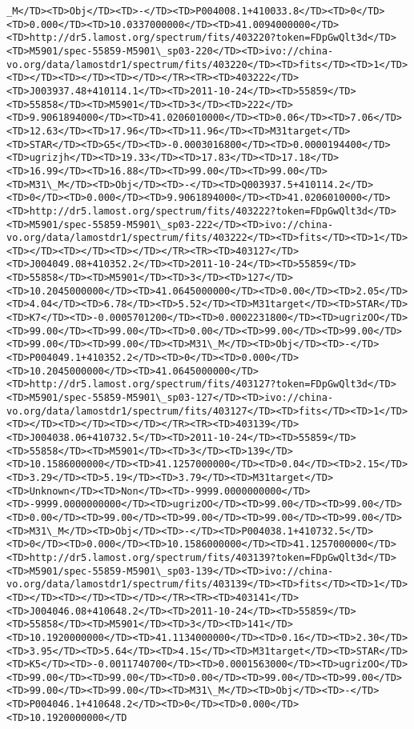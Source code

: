 \documentclass[11pt]{article}
\begin{document}
\begin{Verbatim}[commandchars=\\\{\}]
_M</TD><TD>Obj</TD><TD>-</TD><TD>P004008.1+410033.8</TD><TD>0</TD><TD>0.000</TD><TD>10.0337000000</TD><TD>41.0094000000</TD><TD>http://dr5.lamost.org/spectrum/fits/403220?token=FDpGwQlt3d</TD><TD>M5901/spec-55859-M5901\_sp03-220</TD><TD>ivo://china-vo.org/data/lamostdr1/spectrum/fits/403220</TD><TD>fits</TD><TD>1</TD><TD></TD><TD></TD><TD></TD></TR><TR><TD>403222</TD><TD>J003937.48+410114.1</TD><TD>2011-10-24</TD><TD>55859</TD><TD>55858</TD><TD>M5901</TD><TD>3</TD><TD>222</TD><TD>9.9061894000</TD><TD>41.0206010000</TD><TD>0.06</TD><TD>7.06</TD><TD>12.63</TD><TD>17.96</TD><TD>11.96</TD><TD>M31target</TD><TD>STAR</TD><TD>G5</TD><TD>-0.0003016800</TD><TD>0.0000194400</TD><TD>ugrizjh</TD><TD>19.33</TD><TD>17.83</TD><TD>17.18</TD><TD>16.99</TD><TD>16.88</TD><TD>99.00</TD><TD>99.00</TD><TD>M31\_M</TD><TD>Obj</TD><TD>-</TD><TD>Q003937.5+410114.2</TD><TD>0</TD><TD>0.000</TD><TD>9.9061894000</TD><TD>41.0206010000</TD><TD>http://dr5.lamost.org/spectrum/fits/403222?token=FDpGwQlt3d</TD><TD>M5901/spec-55859-M5901\_sp03-222</TD><TD>ivo://china-vo.org/data/lamostdr1/spectrum/fits/403222</TD><TD>fits</TD><TD>1</TD><TD></TD><TD></TD><TD></TD></TR><TR><TD>403127</TD><TD>J004049.08+410352.2</TD><TD>2011-10-24</TD><TD>55859</TD><TD>55858</TD><TD>M5901</TD><TD>3</TD><TD>127</TD><TD>10.2045000000</TD><TD>41.0645000000</TD><TD>0.00</TD><TD>2.05</TD><TD>4.04</TD><TD>6.78</TD><TD>5.52</TD><TD>M31target</TD><TD>STAR</TD><TD>K7</TD><TD>-0.0005701200</TD><TD>0.0002231800</TD><TD>ugrizOO</TD><TD>99.00</TD><TD>99.00</TD><TD>0.00</TD><TD>99.00</TD><TD>99.00</TD><TD>99.00</TD><TD>99.00</TD><TD>M31\_M</TD><TD>Obj</TD><TD>-</TD><TD>P004049.1+410352.2</TD><TD>0</TD><TD>0.000</TD><TD>10.2045000000</TD><TD>41.0645000000</TD><TD>http://dr5.lamost.org/spectrum/fits/403127?token=FDpGwQlt3d</TD><TD>M5901/spec-55859-M5901\_sp03-127</TD><TD>ivo://china-vo.org/data/lamostdr1/spectrum/fits/403127</TD><TD>fits</TD><TD>1</TD><TD></TD><TD></TD><TD></TD></TR><TR><TD>403139</TD><TD>J004038.06+410732.5</TD><TD>2011-10-24</TD><TD>55859</TD><TD>55858</TD><TD>M5901</TD><TD>3</TD><TD>139</TD><TD>10.1586000000</TD><TD>41.1257000000</TD><TD>0.04</TD><TD>2.15</TD><TD>3.29</TD><TD>5.19</TD><TD>3.79</TD><TD>M31target</TD><TD>Unknown</TD><TD>Non</TD><TD>-9999.0000000000</TD><TD>-9999.0000000000</TD><TD>ugrizOO</TD><TD>99.00</TD><TD>99.00</TD><TD>0.00</TD><TD>99.00</TD><TD>99.00</TD><TD>99.00</TD><TD>99.00</TD><TD>M31\_M</TD><TD>Obj</TD><TD>-</TD><TD>P004038.1+410732.5</TD><TD>0</TD><TD>0.000</TD><TD>10.1586000000</TD><TD>41.1257000000</TD><TD>http://dr5.lamost.org/spectrum/fits/403139?token=FDpGwQlt3d</TD><TD>M5901/spec-55859-M5901\_sp03-139</TD><TD>ivo://china-vo.org/data/lamostdr1/spectrum/fits/403139</TD><TD>fits</TD><TD>1</TD><TD></TD><TD></TD><TD></TD></TR><TR><TD>403141</TD><TD>J004046.08+410648.2</TD><TD>2011-10-24</TD><TD>55859</TD><TD>55858</TD><TD>M5901</TD><TD>3</TD><TD>141</TD><TD>10.1920000000</TD><TD>41.1134000000</TD><TD>0.16</TD><TD>2.30</TD><TD>3.95</TD><TD>5.64</TD><TD>4.15</TD><TD>M31target</TD><TD>STAR</TD><TD>K5</TD><TD>-0.0011740700</TD><TD>0.0001563000</TD><TD>ugrizOO</TD><TD>99.00</TD><TD>99.00</TD><TD>0.00</TD><TD>99.00</TD><TD>99.00</TD><TD>99.00</TD><TD>99.00</TD><TD>M31\_M</TD><TD>Obj</TD><TD>-</TD><TD>P004046.1+410648.2</TD><TD>0</TD><TD>0.000</TD><TD>10.1920000000</TD
\end{Verbatim}
\end{document}
